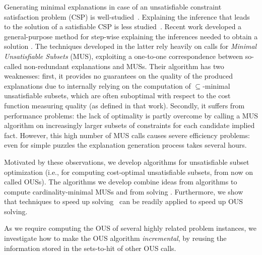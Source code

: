 


Generating minimal explanations in case of an unsatisfiable constraint satisfaction problem (CSP) is well-studied~\cite{junker2001quickxplain}. Explaining the inference that leads to the solution of a satisfiable CSP is less studied~\cite{sqalli1996inference,freuder2001explanation}. Recent work developed a general-purpose method for step-wise explaining the inferences needed to obtain a solution \cite{ecai/BogaertsGCG20}. 
The techniques developed in the latter rely heavily on calls for  \emph{Minimal Unsatisfiable Subsets} (MUS), exploiting a one-to-one correspondence between so-called non-redundant explanations and MUSs. 
Their algorithm has two weaknesses: first, it provides no guarantees on the quality of the produced explanations due to internally relying on the computation of $\subseteq$-minimal unsatisfiable subsets, which are often suboptimal with respect to the cost function measuring quality (as defined in that work). 
Secondly, it suffers from performance problems: the lack of optimality is partly overcome by calling a MUS algorithm on increasingly larger subsets of constraints for each candidate implied fact. %
However, this high number of MUS calls causes severe efficiency problems: even for simple puzzles the explanation generation process takes several hours.


Motivated by these observations, we develop algorithms for unsatisfiable subset optimization (i.e., for computing cost-optimal unsatisfiable subsets, from now on called OUSs). The algorithms we develop combine ideas from 
\hitsetbased algorithms to compute cardinality-minimal MUSs \cite{ignatiev2015smallest} and from \maxsat solving \cite{DBLP:conf/sat/DaviesB13}.
Furthermore, we show that techniques to speed up \hitsetbased \maxsat solving~\cite{davies} can be readily applied to speed up \hitsetbased OUS solving.

As we require computing the OUS of several highly related problem instances, 
we investigate how to make the OUS algorithm \emph{incremental}, by reusing the information stored in the sets-to-hit of other OUS calls.

